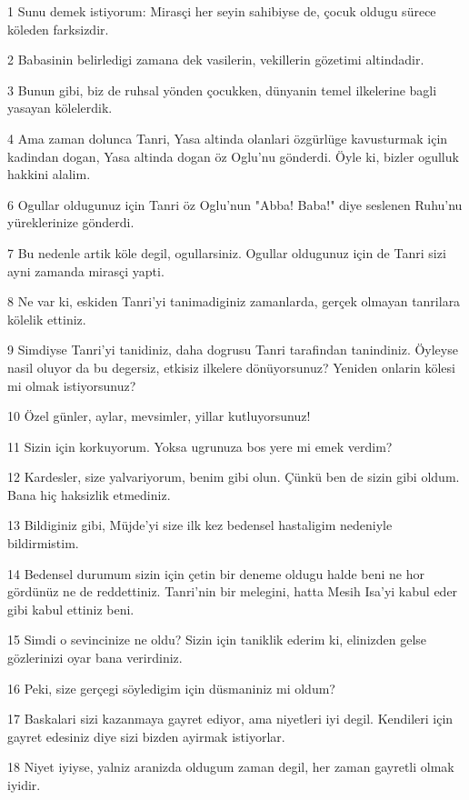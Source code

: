 \par 1 Sunu demek istiyorum: Mirasçi her seyin sahibiyse de, çocuk oldugu sürece köleden farksizdir.
\par 2 Babasinin belirledigi zamana dek vasilerin, vekillerin gözetimi altindadir.
\par 3 Bunun gibi, biz de ruhsal yönden çocukken, dünyanin temel ilkelerine bagli yasayan kölelerdik.
\par 4 Ama zaman dolunca Tanri, Yasa altinda olanlari özgürlüge kavusturmak için kadindan dogan, Yasa altinda dogan öz Oglu'nu gönderdi. Öyle ki, bizler ogulluk hakkini alalim.
\par 6 Ogullar oldugunuz için Tanri öz Oglu'nun "Abba! Baba!" diye seslenen Ruhu'nu yüreklerinize gönderdi.
\par 7 Bu nedenle artik köle degil, ogullarsiniz. Ogullar oldugunuz için de Tanri sizi ayni zamanda mirasçi yapti.
\par 8 Ne var ki, eskiden Tanri'yi tanimadiginiz zamanlarda, gerçek olmayan tanrilara kölelik ettiniz.
\par 9 Simdiyse Tanri'yi tanidiniz, daha dogrusu Tanri tarafindan tanindiniz. Öyleyse nasil oluyor da bu degersiz, etkisiz ilkelere dönüyorsunuz? Yeniden onlarin kölesi mi olmak istiyorsunuz?
\par 10 Özel günler, aylar, mevsimler, yillar kutluyorsunuz!
\par 11 Sizin için korkuyorum. Yoksa ugrunuza bos yere mi emek verdim?
\par 12 Kardesler, size yalvariyorum, benim gibi olun. Çünkü ben de sizin gibi oldum. Bana hiç haksizlik etmediniz.
\par 13 Bildiginiz gibi, Müjde'yi size ilk kez bedensel hastaligim nedeniyle bildirmistim.
\par 14 Bedensel durumum sizin için çetin bir deneme oldugu halde beni ne hor gördünüz ne de reddettiniz. Tanri'nin bir melegini, hatta Mesih Isa'yi kabul eder gibi kabul ettiniz beni.
\par 15 Simdi o sevincinize ne oldu? Sizin için taniklik ederim ki, elinizden gelse gözlerinizi oyar bana verirdiniz.
\par 16 Peki, size gerçegi söyledigim için düsmaniniz mi oldum?
\par 17 Baskalari sizi kazanmaya gayret ediyor, ama niyetleri iyi degil. Kendileri için gayret edesiniz diye sizi bizden ayirmak istiyorlar.
\par 18 Niyet iyiyse, yalniz aranizda oldugum zaman degil, her zaman gayretli olmak iyidir.
